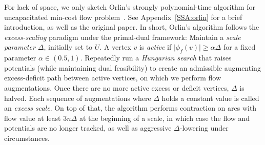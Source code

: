 \documentclass[a4paper,UKenglish]{socg-lipics-v2018}
\def\abs#1{\mathopen| #1 \mathclose|}		%
\def\fsupply{\phi}
\theoremstyle{plain}
\numberwithin{figure}{section}
\def\EMPH#1{\textcolor{BrickRed}{{\emph{#1}}}}
\begin{document}
For lack of space, we only sketch Orlin's strongly polynomial-time algorithm for uncapacitated min-cost flow problem~\cite{O93}.
See Appendix~\ref{SSA:orlin} for a brief introduction, as well as the original paper.
%
In short, Orlin's algorithm follows the \EMPH{excess-scaling} paradigm under the primal-dual framework:
Maintain a \EMPH{scale parameter $\Delta$}, initially set to $U$.
A vertex $v$ is \EMPH{active} if $\abs{\fsupply_f(v)} \geq \alpha\Delta$ for a fixed parameter $\alpha \in (0.5, 1)$.
Repeatedly run a \emph{Hungarian search} that raises potentials (while maintaining dual
feasibility) to create an admissible augmenting excess-deficit path between active vertices, on which
we perform flow augmentations.
Once there are no more active excess or deficit vertices, $\Delta$ is halved.
Each sequence of augmentations where $\Delta$ holds a constant value is called
an \EMPH{excess scale}.
On top of that, the algorithm performs contraction on arcs with flow value at least $3n\Delta$ at the beginning of a scale, in which case the flow and potentials are no longer tracked, as well as aggressive $\Delta$-lowering under circumstances.
\end{document}
